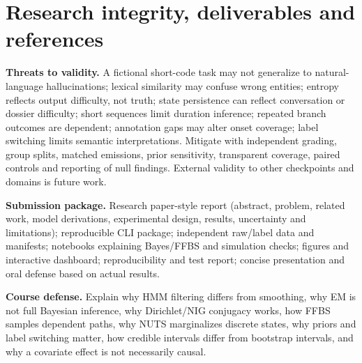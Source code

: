\documentclass[11pt,letterpaper]{article}
\newcommand{\sectionpage}[1]{\clearpage\section{#1}}
\begin{document}
\sectionpage{Research integrity, deliverables and references}
\textbf{Threats to validity.} A fictional short-code task may not generalize to natural-language hallucinations; lexical similarity may confuse wrong entities; entropy reflects output difficulty, not truth; state persistence can reflect conversation or dossier difficulty; short sequences limit duration inference; repeated branch outcomes are dependent; annotation gaps may alter onset coverage; label switching limits semantic interpretations. Mitigate with independent grading, group splits, matched emissions, prior sensitivity, transparent coverage, paired controls and reporting of null findings. External validity to other checkpoints and domains is future work.

\textbf{Submission package.} Research paper-style report (abstract, problem, related work, model derivations, experimental design, results, uncertainty and limitations); reproducible CLI package; independent raw/label data and manifests; notebooks explaining Bayes/FFBS and simulation checks; figures and interactive dashboard; reproducibility and test report; concise presentation and oral defense based on actual results.

\textbf{Course defense.} Explain why HMM filtering differs from smoothing, why EM is not full Bayesian inference, why Dirichlet/NIG conjugacy works, how FFBS samples dependent paths, why NUTS marginalizes discrete states, why priors and label switching matter, how credible intervals differ from bootstrap intervals, and why a covariate effect is not necessarily causal.
\end{document}

